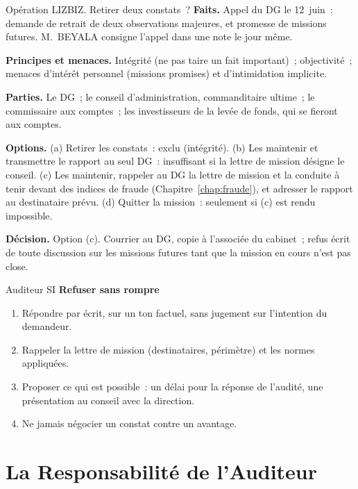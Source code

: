 \begin{boxscenario}{Opération LIZBIZ. Retirer deux constats~?}
\textbf{Faits.} Appel du DG le 12~juin~: demande de retrait de deux
observations majeures, et promesse de missions futures. M.~BEYALA consigne
l'appel dans une note le jour même.

\medskip
\textbf{Principes et menaces.} Intégrité (ne pas taire un fait
important)~; objectivité~; menaces d'intérêt personnel (missions promises)
et d'intimidation implicite.

\medskip
\textbf{Parties.} Le DG~; le conseil d'administration, commanditaire
ultime~; le commissaire aux comptes~; les investisseurs de la levée de
fonds, qui se fieront aux comptes.

\medskip
\textbf{Options.} (a) Retirer les constats~: exclu (intégrité). (b) Les
maintenir et transmettre le rapport au seul DG~: insuffisant si la lettre de
mission désigne le conseil. (c) Les maintenir, rappeler au DG la lettre de
mission et la conduite à tenir devant des indices de fraude
(Chapitre~\ref{chap:fraude}), et adresser le rapport au destinataire prévu.
(d) Quitter la mission~: seulement si (c) est rendu impossible.

\medskip
\textbf{Décision.} Option (c). Courrier au DG, copie à l'associée du
cabinet~; refus écrit de toute discussion sur les missions futures tant que
la mission en cours n'est pas close.
\end{boxscenario}

\begin{boxmetier}{Auditeur SI}
\textbf{Refuser sans rompre}
\begin{enumerate}
    \item Répondre par écrit, sur un ton factuel, sans jugement sur
          l'intention du demandeur.
    \item Rappeler la lettre de mission (destinataires, périmètre) et les
          normes appliquées.
    \item Proposer ce qui est possible~: un délai pour la réponse de
          l'audité, une présentation au conseil avec la direction.
    \item Ne jamais négocier un constat contre un avantage.
\end{enumerate}
\end{boxmetier}

\section{La Responsabilité de l'Auditeur}
\label{sec:c16-responsabilite}

